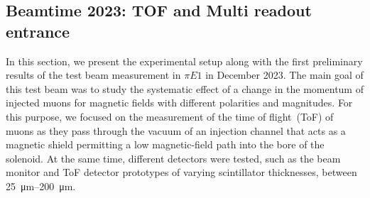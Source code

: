 \begin{refsection}
\section{Beamtime 2023: TOF and Multi readout entrance}
\label{sec:muEDM:beamtime2023}
    In this section, we present the experimental setup along with the first preliminary results of the test beam measurement in $\pi E1$ in December 2023. 
    The main goal of this test beam was to study the systematic effect of a change in the momentum of injected muons for magnetic fields with different polarities and magnitudes. 
    For this purpose, we focused on the measurement of the time of flight~(ToF) of muons as they pass through the vacuum of an injection channel that acts as a magnetic shield permitting a low magnetic-field path into the bore of the solenoid. 
    At the same time, different detectors were tested, such as the beam monitor and ToF detector prototypes of varying scintillator thicknesses, between \SIrange{25}{200}{\micro\meter}.


\end{refsection}

